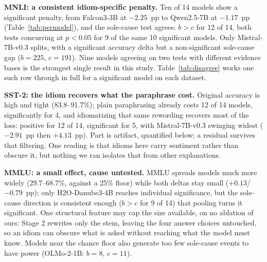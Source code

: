 \documentclass{article}   %
\begin{document}
\textbf{MNLI: a consistent idiom-specific penalty.} Ten of 14 models show a
significant penalty, from Falcon3-3B at $-2.25$~pp to Qwen2.5-7B at $-1.17$~pp
(Table~\ref{tab:permodel}), and the sole-cause test agrees: $b>c$ for 12 of 14,
both tests concurring at $p<0.05$ for 9 of the same 10 significant models. Only
Mistral-7B-v0.3 splits, with a significant accuracy delta but a non-significant
sole-cause gap ($b=225$, $c=191$). Nine models agreeing on two tests with
different evidence bases is the strongest single result in this study.
Table~\ref{tab:disagree} works one such row through in full for a significant
model on each dataset.

\textbf{SST-2: the idiom recovers what the paraphrase cost.} Original accuracy
is high and tight (83.8--91.7\%); plain paraphrasing already costs 12 of 14
models, significantly for 4, and idiomatizing that same rewording recovers
most of the loss: positive for 12 of 14, significant for 5, with
Mistral-7B-v0.3 swinging widest ($-2.91$~pp then $+4.13$~pp). Part is artifact,
quantified below; a residual survives that filtering. One reading is that
idioms here carry sentiment rather than obscure it, but nothing we ran isolates
that from other explanations.

\textbf{MMLU: a small effect, cause untested.} MMLU spreads models much more
widely (29.7--68.7\%, against a 25\% floor) while both deltas stay small
($+0.13$/$-0.79$~pp); only H2O-Danube3-4B reaches individual significance, but
the sole-cause direction is consistent enough ($b>c$ for 9 of 14) that pooling
turns it significant. One structural feature may cap the size available, on no
ablation of ours: Stage 2 rewrites only the stem, leaving the four answer
choices untouched, so an idiom can obscure what is asked without reaching what
the model must know. Models near the chance floor also generate too few
sole-cause events to have power (OLMo-2-1B: $b=8$, $c=11$).
\end{document}
